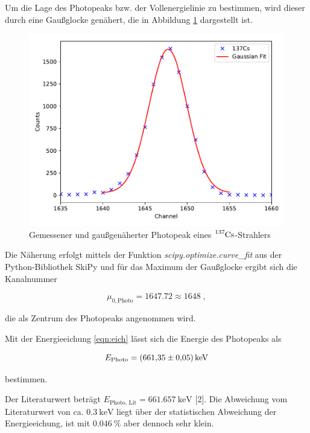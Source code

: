 Um die Lage des Photopeaks bzw. der Vollenergielinie zu bestimmen, wird dieser durch eine Gaußglocke genähert, die in Abbildung
\ref{fig:plot22} dargestellt ist.

\begin{figure}
  \centering
  \includegraphics[scale=0.7]{content/plot22.pdf}
  \caption{Gemessener und gaußgenäherter Photopeak eines $\ce{^{137}Cs}$-Strahlers}
  \label{fig:plot22}
\end{figure}

Die Näherung erfolgt mittels der Funktion \textit{scipy.optimize.curve\_fit} aus der Python-Bibliothek SkiPy und für
das Maximum der Gaußglocke ergibt sich die Kanalnummer

\begin{equation*}
  \mu_{0,\text{Photo}} = \num{1647.72} \approx \num{1648} \; ,
\end{equation*}

die als Zentrum des Photopeaks angenommen wird.

Mit der Energieeichung \eqref{eqn:eich} lässt sich die Energie des Photopeaks als

\begin{equation*}
  E_\text{Photo} = \SI{661.35 +- 0.05}{\kilo\eV}
\end{equation*}

bestimmen.

Der Literaturwert beträgt $E_\text{Photo, Lit} = \SI{661.657}{\kilo\eV}$ [2]. Die Abweichung vom Literaturwert 
von ca. $\SI{0.3}{\kilo\eV}$ liegt über der statistischen Abweichung der Energieeichung, 
ist mit $\SI{0.046}{\percent}$ aber dennoch sehr klein.

